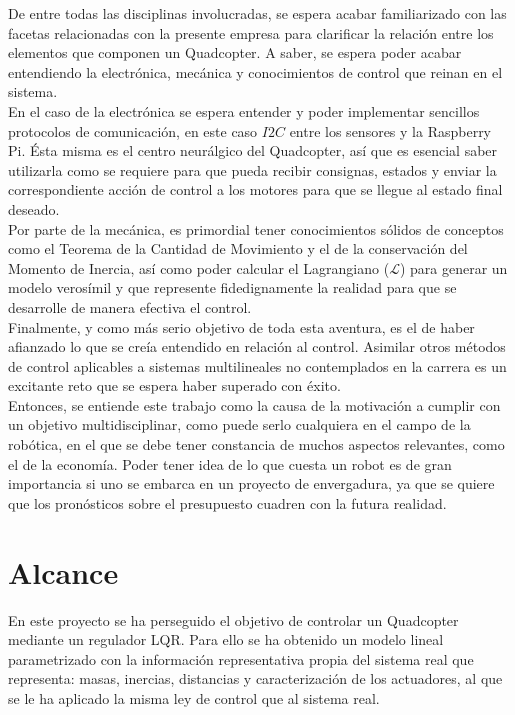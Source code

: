 \documentclass[twoside,11pt]{book}
\begin{document}
De entre todas las disciplinas involucradas, se espera acabar familiarizado con las facetas relacionadas con la presente empresa para clarificar la relación entre los elementos que componen un Quadcopter.  A saber, se espera poder acabar entendiendo la electrónica, mecánica y conocimientos de control que reinan en el sistema. \\

En el caso de la electrónica se espera entender y poder implementar sencillos protocolos de comunicación, en este caso $I2C$ entre los sensores y la Raspberry Pi. Ésta misma es el centro neurálgico del Quadcopter, así que es esencial saber utilizarla como se requiere para que pueda recibir consignas, estados y enviar la correspondiente acción de control a los motores para que se llegue al estado final deseado. \\

Por parte de la mecánica, es primordial tener conocimientos sólidos de conceptos como el Teorema de la Cantidad de Movimiento y el de la conservación del Momento de Inercia, así como poder calcular el Lagrangiano ($\mathcal{L}$) para generar un modelo verosímil y que represente fidedignamente la realidad para que se desarrolle de manera efectiva el control. \\

Finalmente, y como más serio objetivo de toda esta aventura, es el de haber afianzado lo que se creía entendido en relación al control. Asimilar otros métodos de control aplicables a sistemas multilineales no contemplados en la carrera es un excitante reto que se espera haber superado con éxito. \\

Entonces, se entiende este trabajo como la causa de la motivación a cumplir con un objetivo multidisciplinar, como puede serlo cualquiera en el campo de la robótica, en el que se debe tener constancia de muchos aspectos relevantes, como el de la economía. Poder tener idea de lo que cuesta un robot es de gran importancia si uno se embarca en un proyecto de envergadura, ya que se quiere que los pronósticos sobre el presupuesto cuadren con la futura realidad. 
\section{Alcance}

En este proyecto se ha perseguido el objetivo de controlar un Quadcopter mediante un regulador LQR. Para ello se ha obtenido un modelo lineal parametrizado con la información representativa propia del sistema real que representa: masas, inercias, distancias y caracterización de los actuadores, al que se le ha aplicado la misma ley de control que al sistema real. \\
\end{document}
